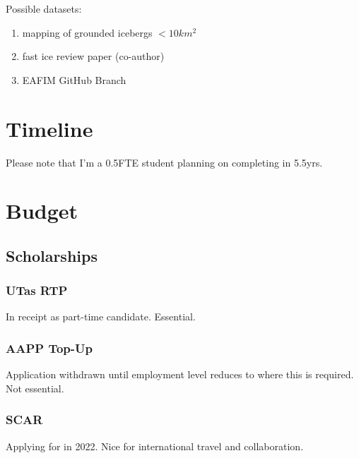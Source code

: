 \documentclass[11pt,a4paper]{article}
\begin{document}
Possible datasets:
\begin{enumerate}
\item mapping of grounded icebergs $<10km^2$
\item fast ice review paper (co-author)
\item EAFIM GitHub Branch
\end{enumerate}

\section*{Timeline}
%
Please note that I'm a 0.5FTE student planning on completing in 5.5yrs.
\newpage
\begin{landscape}
\thispagestyle{empty}

\end{landscape}
\restoregeometry
\newpage
\section*{Budget}
%
\subsection{Scholarships}
\subsubsection{UTas RTP}
In receipt as part-time candidate. Essential.
\subsubsection{AAPP Top-Up}
Application withdrawn until employment level reduces to where this is required. Not essential.
\subsubsection{SCAR}
Applying for in 2022. Nice for international travel and collaboration.
\end{document}
